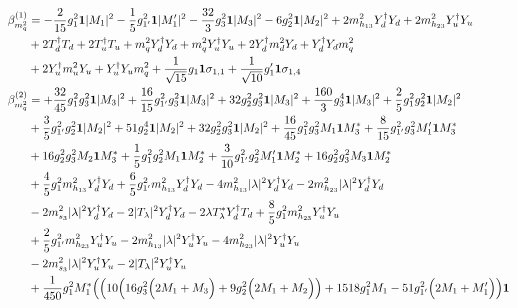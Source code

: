 {\allowdisplaybreaks  \begin{align} 
\beta_{m_q^2}^{(1)} & =  
-\frac{2}{15} g_{1}^{2} {\bf 1} |M_1|^2 -\frac{1}{5} g_{1'}^{2} {\bf 1} |M_1'|^2 -\frac{32}{3} g_{3}^{2} {\bf 1} |M_3|^2 -6 g_{2}^{2} {\bf 1} |M_2|^2 +2 m_{h_{13}}^2 {Y_{d}^{\dagger}  Y_d} +2 m_{h_{23}}^2 {Y_{u}^{\dagger}  Y_u} \nonumber \\ 
 &+2 {T_{d}^{\dagger}  T_d} +2 {T_{u}^{\dagger}  T_u} +{m_q^2  Y_{d}^{\dagger}  Y_d}+{m_q^2  Y_{u}^{\dagger}  Y_u}+2 {Y_{d}^{\dagger}  m_d^2  Y_d} +{Y_{d}^{\dagger}  Y_d  m_q^2}\nonumber \\ 
 &+2 {Y_{u}^{\dagger}  m_u^2  Y_u} +{Y_{u}^{\dagger}  Y_u  m_q^2}+\frac{1}{\sqrt{15}} g_1 {\bf 1} \sigma_{1,1} +\frac{1}{\sqrt{10}} g_1' {\bf 1} \sigma_{1,4} \\ 
\beta_{m_q^2}^{(2)} & =  
+\frac{32}{45} g_{1}^{2} g_{3}^{2} {\bf 1} |M_3|^2 +\frac{16}{15} g_{1'}^{2} g_{3}^{2} {\bf 1} |M_3|^2 +32 g_{2}^{2} g_{3}^{2} {\bf 1} |M_3|^2 +\frac{160}{3} g_{3}^{4} {\bf 1} |M_3|^2 +\frac{2}{5} g_{1}^{2} g_{2}^{2} {\bf 1} |M_2|^2 \nonumber \\ 
 &+\frac{3}{5} g_{1'}^{2} g_{2}^{2} {\bf 1} |M_2|^2 +51 g_{2}^{4} {\bf 1} |M_2|^2 +32 g_{2}^{2} g_{3}^{2} {\bf 1} |M_2|^2 +\frac{16}{45} g_{1}^{2} g_{3}^{2} M_1 {\bf 1} M_3^* +\frac{8}{15} g_{1'}^{2} g_{3}^{2} M_1' {\bf 1} M_3^* \nonumber \\ 
 &+16 g_{2}^{2} g_{3}^{2} M_2 {\bf 1} M_3^* +\frac{1}{5} g_{1}^{2} g_{2}^{2} M_1 {\bf 1} M_2^* +\frac{3}{10} g_{1'}^{2} g_{2}^{2} M_1' {\bf 1} M_2^* +16 g_{2}^{2} g_{3}^{2} M_3 {\bf 1} M_2^* \nonumber \\ 
 &+\frac{4}{5} g_{1}^{2} m_{h_{13}}^2 {Y_{d}^{\dagger}  Y_d} +\frac{6}{5} g_{1'}^{2} m_{h_{13}}^2 {Y_{d}^{\dagger}  Y_d} -4 m_{h_{13}}^2 |\lambda|^2 {Y_{d}^{\dagger}  Y_d} -2 m_{h_{23}}^2 |\lambda|^2 {Y_{d}^{\dagger}  Y_d} \nonumber \\ 
 &-2 m_{s_3}^2 |\lambda|^2 {Y_{d}^{\dagger}  Y_d} -2 |T_{\lambda}|^2 {Y_{d}^{\dagger}  Y_d} -2 \lambda T_{\lambda}^* {Y_{d}^{\dagger}  T_d} +\frac{8}{5} g_{1}^{2} m_{h_{23}}^2 {Y_{u}^{\dagger}  Y_u} \nonumber \\ 
 &+\frac{2}{5} g_{1'}^{2} m_{h_{23}}^2 {Y_{u}^{\dagger}  Y_u} -2 m_{h_{13}}^2 |\lambda|^2 {Y_{u}^{\dagger}  Y_u} -4 m_{h_{23}}^2 |\lambda|^2 {Y_{u}^{\dagger}  Y_u} \nonumber \\ 
 &-2 m_{s_3}^2 |\lambda|^2 {Y_{u}^{\dagger}  Y_u} -2 |T_{\lambda}|^2 {Y_{u}^{\dagger}  Y_u} \nonumber \\ 
 &+\frac{1}{450} g_{1}^{2} M_1^* \Big(\Big(10 \Big(16 g_{3}^{2} \Big(2 M_1  + M_3\Big) + 9 g_{2}^{2} \Big(2 M_1  + M_2\Big)\Big) + 1518 g_{1}^{2} M_1  -51 g_{1'}^{2} \Big(2 M_1  + M_1'\Big)\Big){\bf 1} \nonumber \\ 

\end{align}}
